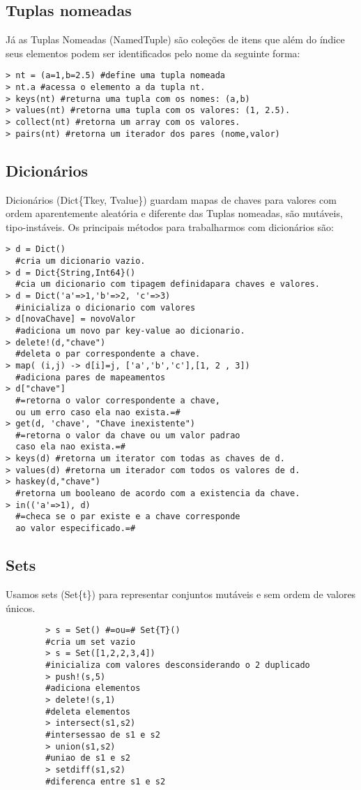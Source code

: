 \subsection{Tuplas nomeadas}
Já as Tuplas Nomeadas (NamedTuple) são coleções de itens que além do índice seus elementos podem ser identificados pelo nome da seguinte forma: 
\begin{lstlisting}
> nt = (a=1,b=2.5) #define uma tupla nomeada
> nt.a #acessa o elemento a da tupla nt.
> keys(nt) #returna uma tupla com os nomes: (a,b)
> values(nt) #retorna uma tupla com os valores: (1, 2.5).
> collect(nt) #retorna um array com os valores.
> pairs(nt) #retorna um iterador dos pares (nome,valor) 
\end{lstlisting}

\subsection{Dicionários}
Dicionários (Dict\{Tkey, Tvalue\}) guardam mapas de chaves para valores com ordem aparentemente aleatória e diferente das Tuplas nomeadas, são mutáveis, tipo-instáveis.
Os principais métodos para trabalharmos com dicionários são:
\begin{lstlisting}
> d = Dict() 
  #cria um dicionario vazio.
> d = Dict{String,Int64}() 
  #cia um dicionario com tipagem definidapara chaves e valores.
> d = Dict('a'=>1,'b'=>2, 'c'=>3) 
  #inicializa o dicionario com valores
> d[novaChave] = novoValor 
  #adiciona um novo par key-value ao dicionario.
> delete!(d,"chave") 
  #deleta o par correspondente a chave.
> map( (i,j) -> d[i]=j, ['a','b','c'],[1, 2 , 3]) 
  #adiciona pares de mapeamentos
> d["chave"] 
  #=retorna o valor correspondente a chave, 
  ou um erro caso ela nao exista.=#
> get(d, 'chave', "Chave inexistente") 
  #=retorna o valor da chave ou um valor padrao 
  caso ela nao exista.=# 
> keys(d) #retorna um iterator com todas as chaves de d.
> values(d) #retorna um iterador com todos os valores de d.
> haskey(d,"chave") 
  #retorna um booleano de acordo com a existencia da chave.
> in(('a'=>1), d) 
  #=checa se o par existe e a chave corresponde 
  ao valor especificado.=#

\end{lstlisting}

\subsection{Sets}
Usamos sets (Set\{t\}) para representar conjuntos mutáveis e sem ordem de valores únicos.
    \begin{lstlisting}
        > s = Set() #=ou=# Set{T}() 
        #cria um set vazio
        > s = Set([1,2,2,3,4]) 
        #inicializa com valores desconsiderando o 2 duplicado
        > push!(s,5) 
        #adiciona elementos
        > delete!(s,1)
        #deleta elementos
        > intersect(s1,s2) 
        #intersessao de s1 e s2
        > union(s1,s2) 
        #uniao de s1 e s2
        > setdiff(s1,s2) 
        #diferenca entre s1 e s2
    \end{lstlisting}

